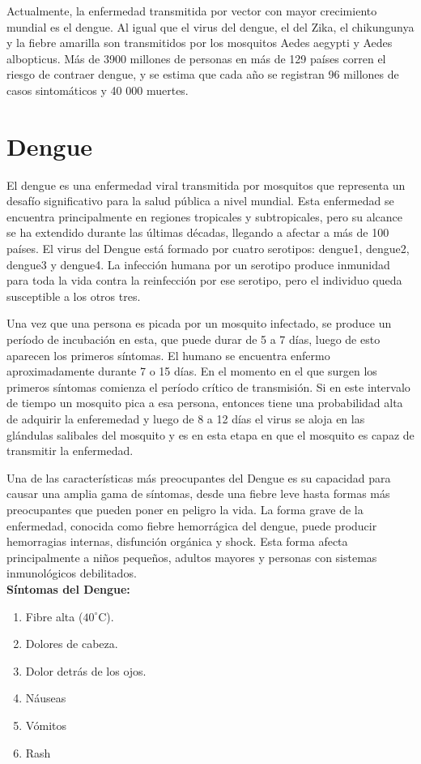 Actualmente, la enfermedad transmitida por vector con mayor crecimiento mundial es el dengue. 
Al igual que el virus del dengue, el del Zika, el chikungunya y la fiebre amarilla son transmitidos 
por los mosquitos Aedes aegypti y Aedes albopticus. Más de 3900 millones de personas en más de 129 
países corren el riesgo de contraer dengue, y se estima que cada año se registran 96 millones de casos 
sintomáticos y 40 000 muertes.\autocite{OMS2020}

\section{Dengue}
El dengue es una enfermedad viral transmitida por mosquitos que representa un desafío significativo 
para la salud pública a nivel mundial. Esta enfermedad se encuentra principalmente en regiones tropicales 
y subtropicales, pero su alcance se ha extendido durante las últimas décadas, llegando a afectar a más de 100 
países. El virus del Dengue está formado por cuatro serotipos: dengue1, dengue2, dengue3 y dengue4. La 
infección humana por un serotipo produce inmunidad para toda la vida contra la reinfección por ese serotipo, 
pero el individuo queda susceptible a los otros tres. \autocite{Simmons2012}

Una vez que una persona es picada por un mosquito infectado, se produce un período de incubación en esta, que puede 
durar de 5 a 7 días, luego de esto aparecen los primeros síntomas. El humano se encuentra enfermo aproximadamente
durante 7 o 15 días. En el momento en el que surgen los primeros síntomas comienza el período crítico de 
transmisión. Si en este intervalo de tiempo un mosquito pica a esa persona, entonces tiene una probabilidad 
alta de adquirir la enferemedad y luego de 8 a 12 días el virus se aloja en las glándulas salibales del mosquito
y es en esta etapa en que el mosquito es capaz de transmitir la enfermedad. \autocite{OMS2023}

Una de las características más preocupantes del Dengue es su capacidad para causar una amplia gama de síntomas, 
desde una fiebre leve hasta formas más preocupantes que pueden poner en peligro la vida. La forma grave de la 
enfermedad, conocida como fiebre hemorrágica del dengue, puede producir hemorragias internas, 
disfunción orgánica y shock. Esta forma afecta principalmente a niños pequeños, 
adultos mayores y personas con sistemas inmunológicos debilitados.\\

\textbf{Síntomas del Dengue:}\autocite{OMS2023}
\begin{enumerate}
    \item Fibre alta ($40^{\circ}$C).
    \item Dolores de cabeza.
    \item Dolor detrás de los ojos.
    \item Náuseas
    \item Vómitos
    \item Rash
\end{enumerate}

